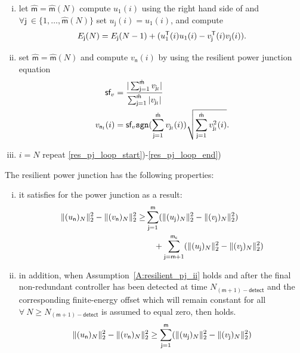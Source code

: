 \begin{definition}
\begin{enumerate}[i)]
\item let
  $\hat{\mathsf{m}}=\hat{\mathsf{m}}(N)$ compute $u_{1}(i)$ using
  the right hand side of  and $\forall \mathsf{j}\ \in
  \{1,\dots,\hat{\mathsf{m}}(N)\}$ set $u_{\mathsf{j}}(i) =u_{1}(i)$,
  and compute  
\begin{equation*}
E_{\mathsf{j}}(N) = E_{\mathsf{j}}(N-1) + (u_1 ^{\mathsf{T}}(i) u_1(i)
-v_{\mathsf{j}}^{\mathsf{T}}(i) v_{\mathsf{j}}(i)).
\end{equation*}
\item \label{res_pj_loop_end} set $\hat{\mathsf{m}}=\hat{\mathsf{m}}(N)$ and compute
  $v_{\mathsf{n}}(i)$ by using the resilient power junction equation
\begin{align}
 \textsf{sf}_v &= \frac{|\sum_{\mathsf{j}=1}^{\hat{\mathsf{m}}}
   v_{\mathsf{j}_l}|}{\sum_{\mathsf{j}=1}^{\hat{\mathsf{m}}}
   |v_{\mathsf{j}_l}|} \nonumber\\
\label{E:vn_apj}
  v_{\mathsf{n}_l}(i) &= \textsf{sf}_v \mathtt{sgn}(\sum_{\mathsf{j}=1}^{\hat{\mathsf{m}}} v_{\mathsf{j}_l}(i))\sqrt{\sum_{\mathsf{j}=1}^{\hat{\mathsf{m}}}
      v_{\mathsf{j}_l}^2(i)}.
\end{align}
\item $i=N$ repeat \ref{res_pj_loop_start})-\ref{res_pj_loop_end})
\end{enumerate}
\end{definition}
\begin{lemma}
\label{L:resilient_pj}
The resilient power junction has the following properties:
\begin{enumerate}[i)]
\item it satisfies
  \cite[Definition~1]{kottenstette08:_contr_of_multip_networ_passiv}
  for the power junction as a result:%
\begin{equation*}
\begin{split}
\|(u_{\mathsf{n}})_N\|_{2}^2-\|(v_{\mathsf{n}})_N\|_{2}^2 \geq&
\sum_{\mathsf{j}=1}^{\mathsf{m}}(\|(u_{\mathsf{j}})_N\|_{2}^2-\|(v_{\mathsf{j}})_N\|_{2}^2)\\
& \quad + \sum_{\mathsf{j}=\mathsf{m} +1}^{\mathsf{m_c}}  (\|(u_{\mathsf{j}})_N\|_{2}^2-\|(v_{\mathsf{j}})_N\|_{2}^2)
\end{split}
\end{equation*}
\item in addition, when Assumption~\ref{A:resilient_pj_ii} holds and
  after the final non-redundant controller has been detected at time
  $N_{(\mathsf{m}+1)-\mathsf{detect}}$ and the corresponding
  finite-energy offset which will remain constant for all  $\forall\ N
  \geq N_{(\mathsf{m}+1)-\mathsf{detect}}$ is assumed to equal zero,
  then  holds.%
\begin{equation}
\label{E:key_inequality}
\|(u_{\mathsf{n}})_N\|_{2}^2-\|(v_{\mathsf{n}})_N\|_{2}^2 \geq
\sum_{\mathsf{j}=1}^{\mathsf{m}}(\|(u_{\mathsf{j}})_N\|_{2}^2-\|(v_{\mathsf{j}})_N\|_{2}^2)
\end{equation}
\end{enumerate}
\end{lemma}
